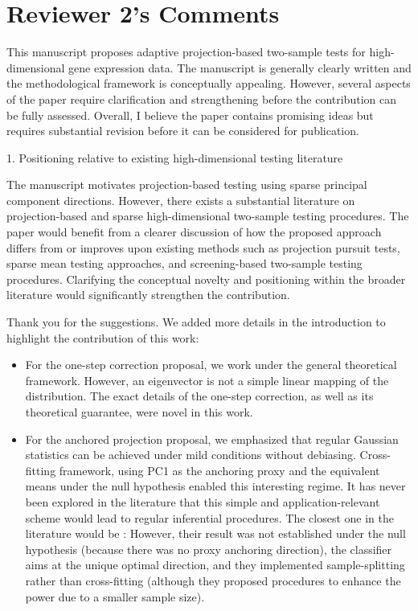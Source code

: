 \documentclass{article}
\theoremstyle{definition}
\begin{document}
\newpage
\section{Reviewer 2's Comments}

\begin{shaded}
    This manuscript proposes adaptive projection-based two-sample tests for high-dimensional gene expression data.  The manuscript is generally clearly written and the methodological framework is conceptually appealing. However, several aspects of the paper require clarification and strengthening before the contribution can be fully assessed. Overall, I believe the paper contains promising ideas but requires substantial revision before it can be considered for publication.
\end{shaded}

\begin{shaded}
    1. Positioning relative to existing high-dimensional testing literature
    
The manuscript motivates projection-based testing using sparse principal component directions. However, there exists a substantial literature on projection-based and sparse high-dimensional two-sample testing procedures. The paper would benefit from a clearer discussion of how the proposed approach differs from or improves upon existing methods such as projection pursuit tests, sparse mean testing approaches, and screening-based two-sample testing procedures. Clarifying the conceptual novelty and positioning within the broader literature would significantly strengthen the contribution.
\end{shaded}

Thank you for the suggestions. We added more details in the introduction to highlight the contribution of this work:

\begin{itemize}
    \item For the one-step correction proposal, we work under the general theoretical framework. However, an eigenvector is not a simple linear mapping of the distribution. The exact details of the one-step correction, as well as its theoretical guarantee, were novel in this work. 
    \item For the anchored projection proposal, we emphasized that regular Gaussian statistics can be achieved under mild conditions without debiasing. Cross-fitting framework, using PC1 as the anchoring proxy and the equivalent means under the null hypothesis enabled this interesting regime. It has never been explored in the literature that this simple and application-relevant scheme would lead to regular inferential procedures. The closest one in the literature would be \cite{liu2022multiple}: However, their result was not established under the null hypothesis (because there was no proxy anchoring direction), the classifier aims at the unique optimal direction, and they implemented sample-splitting rather than cross-fitting (although they proposed procedures to enhance the power due to a smaller sample size).
\end{itemize}
\end{document}
